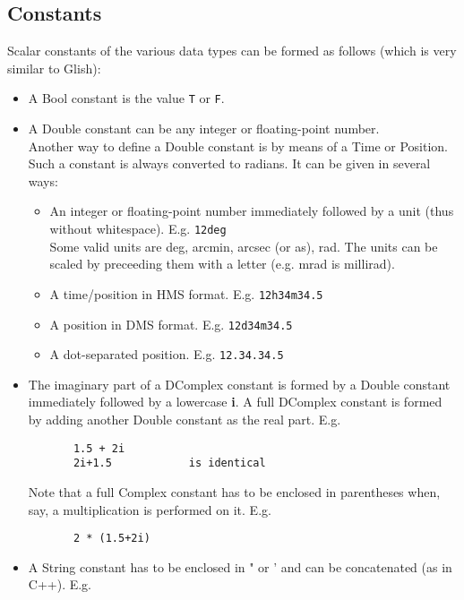 \subsection{\label{TAQL:CONSTANTS}Constants}
Scalar constants of the various data types can be formed as follows
(which is very similar to Glish):
\begin{itemize}
  \item A Bool constant is the value \texttt{T} or \texttt{F}.
  \item A Double constant can be any integer or floating-point number.
       \\Another way to define a Double constant is by means of
       a Time or Position. Such a constant is always converted to radians.
       It can be given in several ways:
       \begin{itemize}
         \item An integer or floating-point number immediately
              followed by a unit
              (thus without whitespace). E.g. \texttt{12deg}
              \\Some valid units are deg, arcmin, arcsec (or as), rad.
              The units can be scaled by preceeding them with a letter
              (e.g. mrad is millirad).
         \item A time/position in HMS format.
              E.g. \texttt{12h34m34.5}
         \item A position in DMS format.
              E.g. \texttt{12d34m34.5}
         \item A dot-separated position.
              E.g. \texttt{12.34.34.5}
       \end{itemize}
  \item The imaginary part of a DComplex constant is formed by a Double
       constant immediately followed by a lowercase \textbf{i}. A full DComplex
       constant is formed by adding another Double constant as the
       real part. E.g.
       \begin{verbatim}
       1.5 + 2i
       2i+1.5            is identical
       \end{verbatim}
       Note that a full Complex constant has to be enclosed
       in parentheses when, say, a multiplication is performed on it. E.g.
       \begin{verbatim}
       2 * (1.5+2i)
       \end{verbatim}
  \item A String constant has to be enclosed in " or ' and can be
       concatenated (as in C++). E.g.
       \begin{verbatim}

\end{verbatim}
\end{itemize}
